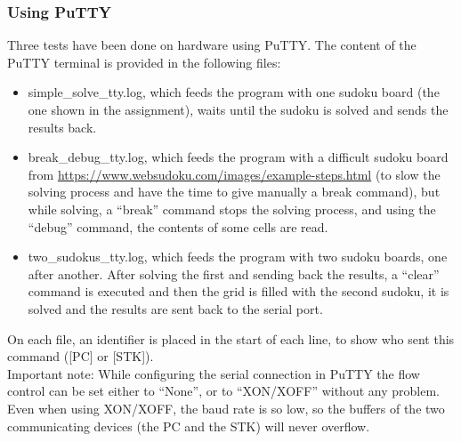 \documentclass[12pt, a4, hidelinks]{article}
\begin{document}
\subsubsection*{Using PuTTY}
Three tests have been done on hardware using PuTTY. The content of the PuTTY terminal is provided in the following files:
\begin{itemize}
\item simple\_solve\_tty.log, which feeds the program with one sudoku board (the one shown in the assignment), waits until the sudoku is solved and sends the results back.
\item break\_debug\_tty.log, which feeds the program with a difficult sudoku board from \url{https://www.websudoku.com/images/example-steps.html} (to slow the solving process and have the time to give manually a break command), but while solving, a “break” command stops the solving process, and using the “debug” command, the contents of some cells are read.
\item two\_sudokus\_tty.log, which feeds the program with two sudoku boards, one after another. After solving the first and sending back the results, a “clear” command is executed and then the grid is filled with the second sudoku, it is solved and the results are sent back to the serial port.
\end{itemize}
On each file, an identifier is placed in the start of each line, to show who sent this command ([PC] or [STK]).\\
Important note: While configuring the serial connection in PuTTY the flow control can be set either to ``None'', or to ``XON/XOFF'' without any problem. Even when using XON/XOFF, the baud rate is so low, so the buffers of the two communicating devices (the PC and the STK) will never overflow.
\end{document}
